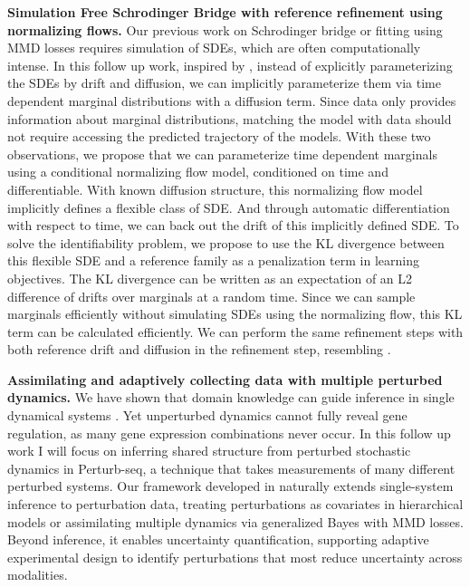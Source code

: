 \textbf{Simulation Free Schrodinger Bridge with reference refinement using normalizing flows.}
Our previous work on Schrodinger bridge or fitting using MMD losses requires simulation of SDEs, which are often computationally intense. In this follow up work, inspired by \cite{bartosh2025sde}, instead of explicitly parameterizing the SDEs by drift and diffusion, we can implicitly parameterize them via time dependent marginal distributions with a diffusion term. Since data only provides information about marginal distributions, matching the model with data should not require accessing the predicted trajectory of the models. With these two observations, we propose that we can parameterize time dependent marginals using a conditional normalizing flow model, conditioned on time and differentiable. With known diffusion structure, this normalizing flow model implicitly defines a flexible class of SDE. And through automatic differentiation with respect to time, we can back out the drift of this implicitly defined SDE. To solve the identifiability problem, we propose to use the KL divergence between this flexible SDE and a reference family as a penalization term in learning objectives. The KL divergence can be written as an expectation of an L2 difference of drifts over marginals at a random time. Since we can sample marginals efficiently without simulating SDEs using the normalizing flow, this KL term can be calculated efficiently. We can perform the same refinement steps with both reference drift and diffusion in the refinement step, resembling \cite{guan2024identifying}. 



\textbf{Assimilating and adaptively collecting data with multiple perturbed dynamics.}
We have shown that domain knowledge can guide inference in single dynamical systems \cite{shen2025multi, berlinghieri2025oh}. Yet unperturbed dynamics cannot fully reveal gene regulation, as many gene expression combinations never occur.  In this follow up work I will focus on inferring shared structure from perturbed stochastic dynamics in Perturb-seq, a technique that takes measurements of many different perturbed systems. Our framework developed in \cite{berlinghieri2025oh} naturally extends single-system inference to perturbation data, treating perturbations as covariates in hierarchical models or assimilating multiple dynamics via generalized Bayes with MMD losses. Beyond inference, it enables uncertainty quantification, supporting adaptive experimental design to identify perturbations that most reduce uncertainty across modalities. 

